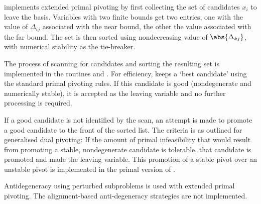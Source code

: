 \dylp implements extended primal pivoting by first collecting the set of
candidates $x_i$ to leave the basis.
Variables with two finite bounds get two entries, one with the value of
$\Delta_{ij}$ associated with the near bound, the other the value associated with
the far bound.
The set is then sorted using nondecreasing value of $\abs{\Delta_{kj}}$,
with numerical stability as the tie-breaker.

The process of scanning for candidates and sorting the resulting set is
implemented in the routines  and
.
For efficiency,  keeps a `best candidate' using
the standard primal pivoting rules.
If this candidate is good (nondegenerate and numerically stable), it is
accepted as the leaving variable and no further processing is required.

If a good candidate is not identified by the scan, an attempt is made to
promote a good candidate to the front of the sorted list.
The criteria is as outlined for generalised dual pivoting: If the amount of
primal infeasibility that would result from promoting a stable, nondegenerate
candidate is tolerable, that candidate is promoted and made the leaving
variable.
This promotion of a stable pivot over an unstable pivot is implemented in
the primal version of .

Antidegeneracy using perturbed subproblems is used with extended primal
pivoting.
The alignment-based anti-degeneracy strategies are not implemented.

